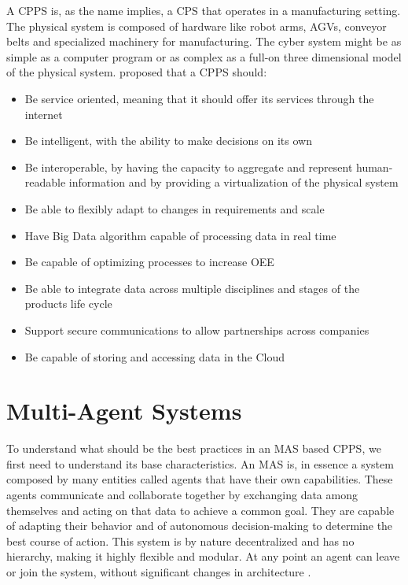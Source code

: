 A \Gls{CPPS} is, as the name implies, a \gls{CPS} that operates in a manufacturing setting. The physical system is composed of hardware like robot arms, \gls{AGV}s, conveyor belts and specialized machinery for manufacturing. The cyber system might be as simple as a computer program or as complex as a full-on three dimensional model of the physical system. \citeauthor{birgit01} \cite{birgit01} proposed that a \gls{CPPS} should:
\begin{itemize}
	\item Be service oriented, meaning that it should offer its services through the internet
	\item Be intelligent, with the ability to make decisions on its own
	\item Be interoperable, by having the capacity to aggregate and represent human-readable information and by providing a virtualization of the physical system
	\item Be able to flexibly adapt to changes in requirements and scale
	\item Have Big Data algorithm capable of processing data in real time
	\item Be capable of optimizing processes to increase \gls{OEE}
	\item Be able to integrate data across multiple disciplines and stages of the products life cycle
	\item Support secure communications to allow partnerships across companies
	\item Be capable of storing and accessing data in the Cloud
\end{itemize}

\section{Multi-Agent Systems}
\label{sec:multi-agent_systems}



To understand what should be the best practices in an \gls{MAS} based \gls{CPPS}, we first need to understand its base characteristics. An \Gls{MAS} is, in essence a system composed by many entities called agents that have their own capabilities. These agents communicate and collaborate together by exchanging data among themselves and acting on that data to achieve a common goal. They are capable of adapting their behavior and of autonomous decision-making to determine the best course of action. This system is by nature decentralized and has no hierarchy, making it highly flexible and modular. At any point an agent can leave or join the system, without significant changes in architecture \cite{paulo02}.\\

